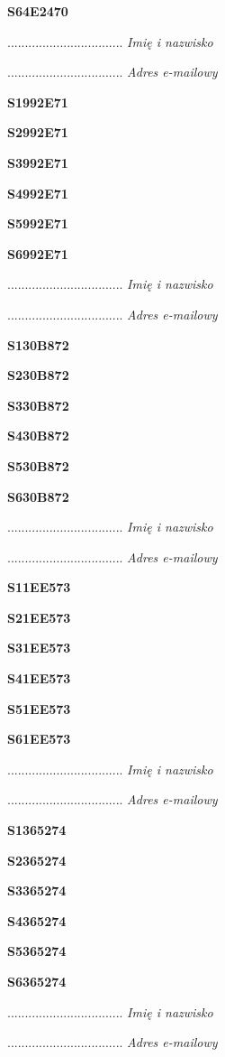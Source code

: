 \Large \textbf{S64E2470}

.................................
\textit{Imię i nazwisko}

.................................
\textit{Adres e-mailowy}

\Large \textbf{S1992E71}

\Large \textbf{S2992E71}

\Large \textbf{S3992E71}

\Large \textbf{S4992E71}

\Large \textbf{S5992E71}

\Large \textbf{S6992E71}

.................................
\textit{Imię i nazwisko}

.................................
\textit{Adres e-mailowy}

\Large \textbf{S130B872}

\Large \textbf{S230B872}

\Large \textbf{S330B872}

\Large \textbf{S430B872}

\Large \textbf{S530B872}

\Large \textbf{S630B872}

.................................
\textit{Imię i nazwisko}

.................................
\textit{Adres e-mailowy}

\Large \textbf{S11EE573}

\Large \textbf{S21EE573}

\Large \textbf{S31EE573}

\Large \textbf{S41EE573}

\Large \textbf{S51EE573}

\Large \textbf{S61EE573}

.................................
\textit{Imię i nazwisko}

.................................
\textit{Adres e-mailowy}

\Large \textbf{S1365274}

\Large \textbf{S2365274}

\Large \textbf{S3365274}

\Large \textbf{S4365274}

\Large \textbf{S5365274}

\Large \textbf{S6365274}

.................................
\textit{Imię i nazwisko}

.................................
\textit{Adres e-mailowy}

